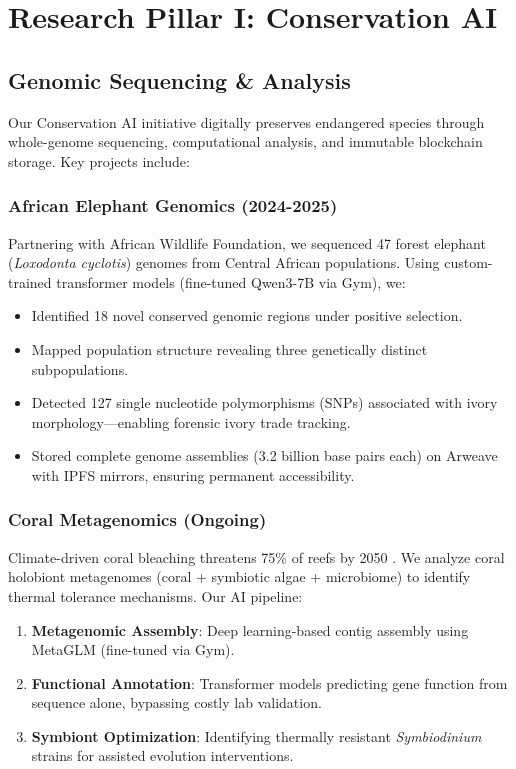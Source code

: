 \section{Research Pillar I: Conservation AI}


\subsection{Genomic Sequencing \& Analysis}

Our Conservation AI initiative digitally preserves endangered species through whole-genome sequencing, computational analysis, and immutable blockchain storage. Key projects include:

\subsubsection{African Elephant Genomics (2024-2025)}
Partnering with African Wildlife Foundation, we sequenced 47 forest elephant (\textit{Loxodonta cyclotis}) genomes from Central African populations. Using custom-trained transformer models (fine-tuned Qwen3-7B via Gym), we:
\begin{itemize}
    \item Identified 18 novel conserved genomic regions under positive selection.
    \item Mapped population structure revealing three genetically distinct subpopulations.
    \item Detected 127 single nucleotide polymorphisms (SNPs) associated with ivory morphology—enabling forensic ivory trade tracking.
    \item Stored complete genome assemblies (3.2 billion base pairs each) on Arweave with IPFS mirrors, ensuring permanent accessibility.
\end{itemize}

\subsubsection{Coral Metagenomics (Ongoing)}
Climate-driven coral bleaching threatens 75\% of reefs by 2050 \citep{hughes2018spatial}. We analyze coral holobiont metagenomes (coral + symbiotic algae + microbiome) to identify thermal tolerance mechanisms. Our AI pipeline:
\begin{enumerate}
    \item \textbf{Metagenomic Assembly}: Deep learning-based contig assembly using MetaGLM (fine-tuned via Gym).
    \item \textbf{Functional Annotation}: Transformer models predicting gene function from sequence alone, bypassing costly lab validation.
    \item \textbf{Symbiont Optimization}: Identifying thermally resistant \textit{Symbiodinium} strains for assisted evolution interventions.
\end{enumerate}


